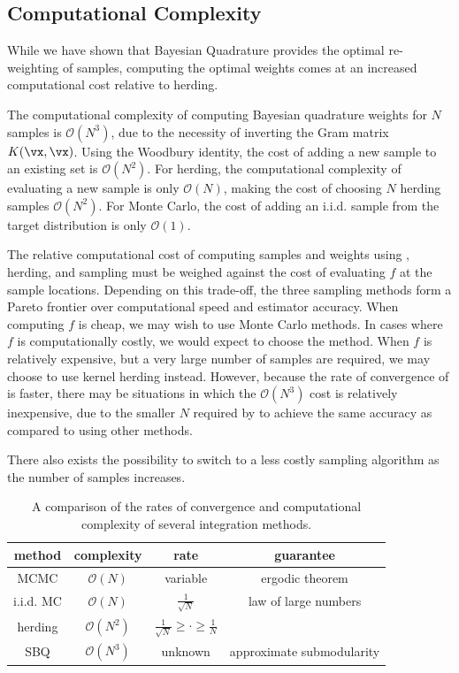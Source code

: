 \subsection{Computational Complexity}

While we have shown that Bayesian Quadrature provides the optimal re-weighting of samples, computing the optimal weights comes at an increased computational cost relative to herding. 

The computational complexity of computing Bayesian quadrature weights for $N$ samples is $\mathcal{O}(N^3)$, due to the necessity of inverting the Gram matrix $K(\vx, \vx)$. Using the Woodbury identity, the cost of adding a new sample to an existing set is $\mathcal{O}(N^2)$. For herding, the computational complexity of evaluating a new sample is only $\mathcal{O}(N)$, making the cost of choosing $N$ herding samples $\mathcal{O}(N^2)$. For Monte Carlo, the cost of adding an i.i.d. sample from the target distribution is only $\mathcal{O}(1)$.

The relative computational cost of computing samples and weights using \bq{}, herding, and sampling must be weighed against the cost of evaluating $f$ at the sample locations. Depending on this trade-off, the three sampling methods form a Pareto frontier over computational speed and estimator accuracy. When computing $f$ is cheap, we may wish to use Monte Carlo methods. In cases where $f$ is computationally costly, we would expect to choose the \sbq{} method. When $f$ is relatively expensive, but a very large number of samples are required, we may choose to use kernel herding instead. However, because the rate of convergence of \sbq{} is faster, there may be situations in which the $\mathcal{O}(N^3)$ cost is relatively inexpensive, due to the smaller $N$ required by \sbq{} to achieve the same accuracy as compared to using other methods. 

There also exists the possibility to switch to a less costly sampling algorithm as the number of samples increases.

\begin{table}[t]
\begin{center}
\begin{tabular}{c|ccc}
method & complexity & rate & guarantee\\
\midrule
MCMC & $\mathcal{O}(N)$ & variable & ergodic theorem\\
i.i.d. MC & $\mathcal{O}(N)$ & $\frac{1}{\sqrt{N}}$ & law of large numbers\\
herding & $\mathcal{O}(N^2)$ & $\frac{1}{\sqrt{N}} \geq \cdot \geq \frac{1}{N}$ & \citep{chen2010super,bach2012equivalence} \\
SBQ & $\mathcal{O}(N^3)$ & unknown & approximate submodularity\\
\end{tabular}
\end{center}
\caption{A comparison of the rates of convergence and computational complexity of several integration methods.}
\label{tbl:rates}
\end{table}


